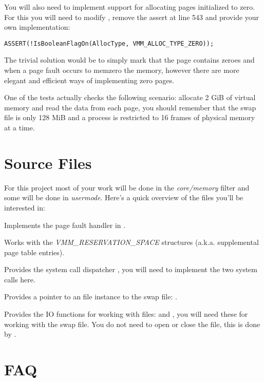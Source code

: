 You will also need to implement support for allocating pages initialized to zero. For this you will
need to modify , remove the assert at line 543 and provide your own
implementation:
\begin{verbatim}
ASSERT(!IsBooleanFlagOn(AllocType, VMM_ALLOC_TYPE_ZERO));
\end{verbatim}

The trivial solution would be to simply mark that the page contains zeroes and when a page fault
occurs to memzero the memory, however there are more elegant and efficient ways of implementing
zero pages.

One of the tests actually checks the following scenario: allocate 2 GiB of virtual memory and read
the data from each page, you should remember that the swap file is only 128 MiB and a process is
restricted to 16 frames of physical memory at a time.

\section{Source Files}

For this project most of your work will be done in the \textit{core/memory} filter and some will
be done in \textit{usermode}. Here's a quick overview of the files you'll be interested in:


Implements the page fault handler in .


Works with the \textit{VMM\_RESERVATION\_SPACE} structures (a.k.a. supplemental page table entries).


Provides the system call dispatcher , you will need to implement the two system
calls here.


Provides a pointer to an file instance to the swap file: .


Provides the IO functions for working with files:  and , you will
need these for working with the swap file. You do not need to open or close the file, this is done
by \projectname.

\section{FAQ}

